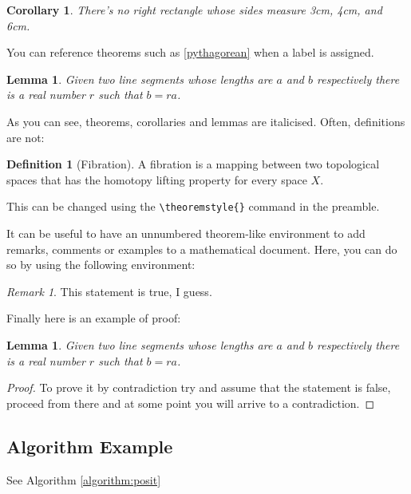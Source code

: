 \documentclass[a4paper,11pt, titlepage]{article}
\theoremstyle{definition}
\newtheorem{definition}{Definition}[section]
\theoremstyle{plain}
\newtheorem{corollary}{Corollary}[theorem]
\newtheorem{lemma}[theorem]{Lemma}
\theoremstyle{remark}
\newtheorem*{remark}{Remark}
\begin{document}
\begin{corollary}
There's no right rectangle whose sides measure 3cm, 4cm, and 6cm.
\end{corollary}

You can reference theorems such as \ref{pythagorean} when a label is assigned.

\begin{lemma}
Given two line segments whose lengths are \(a\) and \(b\) respectively there is a 
real number \(r\) such that \(b=ra\).
\end{lemma}

As you can see, theorems, corollaries and lemmas are italicised. Often, definitions are not: 
\begin{definition}[Fibration]
A fibration is a mapping between two topological spaces that has the homotopy lifting property for every space \(X\).
\end{definition}
This can be changed using the \verb!\theoremstyle{}! command in the preamble. 

It can be useful to have an unnumbered theorem-like environment to add remarks, comments or examples to a mathematical document. Here, you can do so by using the following environment: 

\begin{remark}
This statement is true, I guess.
\end{remark}

Finally here is an example of proof: 

\begin{lemma}
Given two line segments whose lengths are \(a\) and \(b\) respectively there 
is a real number \(r\) such that \(b=ra\).
\end{lemma}

\begin{proof}
To prove it by contradiction try and assume that the statement is false,
proceed from there and at some point you will arrive to a contradiction.
\end{proof}


\subsection{Algorithm Example}

See Algorithm \ref{algorithm:posit}
\end{document}
